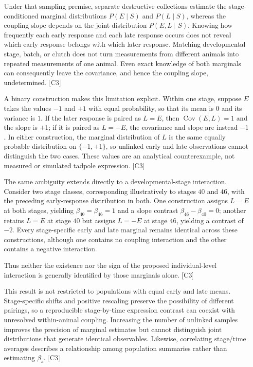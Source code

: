 \documentclass[11pt]{article}
\begin{document}
Under that sampling premise, separate destructive collections estimate the stage-conditioned marginal distributions $P(E\mid S)$ and $P(L\mid S)$, whereas the coupling slope depends on the joint distribution $P(E,L\mid S)$. Knowing how frequently each early response and each late response occurs does not reveal which early response belongs with which later response. Matching developmental stage, batch, or clutch does not turn measurements from different animals into repeated measurements of one animal. Even exact knowledge of both marginals can consequently leave the covariance, and hence the coupling slope, undetermined. [C3]

A binary construction makes this limitation explicit. Within one stage, suppose $E$ takes the values $-1$ and $+1$ with equal probability, so that its mean is $0$ and its variance is $1$. If the later response is paired as $L=E$, then $\operatorname{Cov}(E,L)=1$ and the slope is $+1$; if it is paired as $L=-E$, the covariance and slope are instead $-1$. In either construction, the marginal distribution of $L$ is the same equally probable distribution on $\{-1,+1\}$, so unlinked early and late observations cannot distinguish the two cases. These values are an analytical counterexample, not measured or simulated tadpole expression. [C3]

The same ambiguity extends directly to a developmental-stage interaction. Consider two stage classes, corresponding illustratively to stages $40$ and $46$, with the preceding early-response distribution in both. One construction assigns $L=E$ at both stages, yielding $\beta_{40}=\beta_{46}=1$ and a slope contrast $\beta_{46}-\beta_{40}=0$; another retains $L=E$ at stage $40$ but assigns $L=-E$ at stage $46$, yielding a contrast of $-2$. Every stage-specific early and late marginal remains identical across these constructions, although one contains no coupling interaction and the other contains a negative interaction.

Thus neither the existence nor the sign of the proposed individual-level interaction is generally identified by those marginals alone. [C3]

This result is not restricted to populations with equal early and late means. Stage-specific shifts and positive rescaling preserve the possibility of different pairings, so a reproducible stage-by-time expression contrast can coexist with unresolved within-animal coupling. Increasing the number of unlinked samples improves the precision of marginal estimates but cannot distinguish joint distributions that generate identical observables. Likewise, correlating stage/time averages describes a relationship among population summaries rather than estimating $\beta_s$. [C3]
\end{document}

